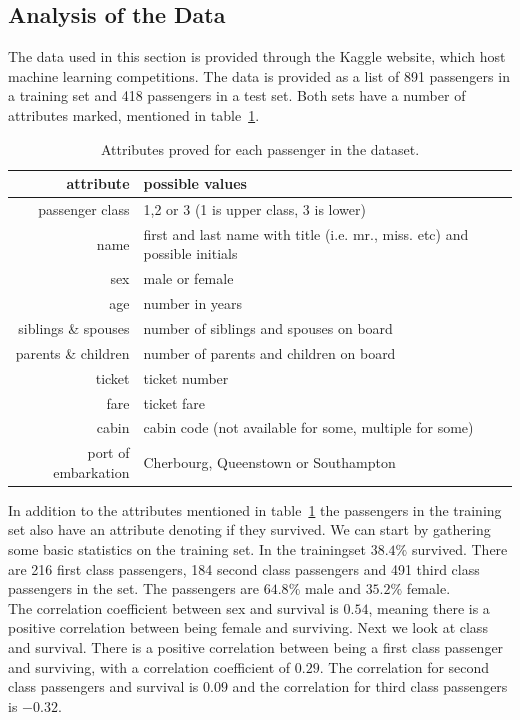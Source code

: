 \documentclass{llncs}
\begin{document}
\subsection{Analysis of the Data}
The data used in this section is provided through the Kaggle website, which host machine learning competitions. The data is provided as a list of 891 passengers in a training set and 418 passengers in a test set. Both sets have a number of attributes marked, mentioned in table~\ref{tab:passenger_attributes}.
\begin{table}[H]
\caption{Attributes proved for each passenger in the dataset.}
\label{tab:passenger_attributes}
\centering
\begin{tabular}{ r | l }
  attribute & possible values \\ \hline \hline
  passenger class & 1,2 or 3 (1 is upper class, 3 is lower)  \\
  name & first and last name with title (i.e. mr., miss. etc) and possible initials  \\
  sex & male or female \\
  age & number in years \\
  siblings \& spouses & number of siblings and spouses on board \\
  parents \& children & number of parents and children on board \\
  ticket & ticket number \\
  fare & ticket fare \\
  cabin & cabin code (not available for some, multiple for some)\\
  port of embarkation & Cherbourg, Queenstown or Southampton
\end{tabular}
\end{table}
In addition to the attributes mentioned in table~\ref{tab:passenger_attributes} the passengers in the training set also have an attribute denoting if they survived.  We can start by gathering some basic statistics on the training set. In the trainingset $38.4\%$ survived. There are 216 first class passengers, 184 second class passengers and 491 third class passengers in the set. The passengers are $64.8\%$ male and $35.2\%$ female.\\
The correlation coefficient between sex and survival is $0.54$, meaning there is a positive correlation between being female and surviving. Next we look at class and survival. There is a positive correlation between being a first class passenger and surviving, with a correlation coefficient of $0.29$. The correlation for second class passengers and survival is $0.09$ and the correlation for third class passengers is $-0.32$.\\
\end{document}
